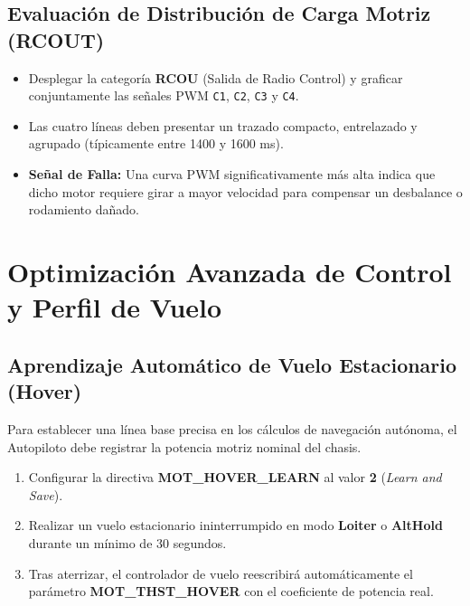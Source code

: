 \documentclass[12pt,a4paper]{article}
\begin{document}
\subsection{Evaluación de Distribución de Carga Motriz (RCOUT)}
\begin{itemize}[leftmargin=*]
    \item Desplegar la categoría \textbf{RCOU} (Salida de Radio Control) y graficar conjuntamente las señales PWM \texttt{C1}, \texttt{C2}, \texttt{C3} y \texttt{C4}.
    \item Las cuatro líneas deben presentar un trazado compacto, entrelazado y agrupado (típicamente entre 1400 y 1600 ms).
    \item \textbf{Señal de Falla:} Una curva PWM significativamente más alta indica que dicho motor requiere girar a mayor velocidad para compensar un desbalance o rodamiento dañado.
\end{itemize}

\section{Optimización Avanzada de Control y Perfil de Vuelo}

\subsection{Aprendizaje Automático de Vuelo Estacionario (Hover)}
Para establecer una línea base precisa en los cálculos de navegación autónoma, el Autopiloto debe registrar la potencia motriz nominal del chasis.
\begin{enumerate}[leftmargin=*]
    \item Configurar la directiva \textbf{MOT\_HOVER\_LEARN} al valor \textbf{2} (\textit{Learn and Save}).
    \item Realizar un vuelo estacionario ininterrumpido en modo \textbf{Loiter} o \textbf{AltHold} durante un mínimo de 30 segundos.
    \item Tras aterrizar, el controlador de vuelo reescribirá automáticamente el parámetro \textbf{MOT\_THST\_HOVER} con el coeficiente de potencia real.
\end{enumerate}
\end{document}
